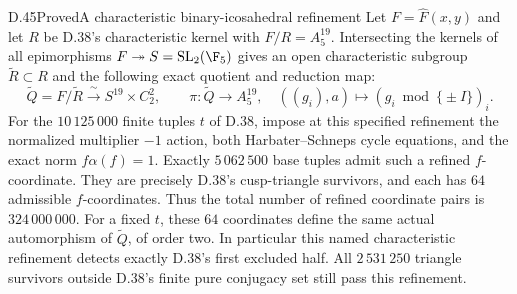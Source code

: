 \begin{claim}{D.45}{Proved}{A characteristic binary-icosahedral refinement}
Let $F=\widehat F(x,y)$ and let $R$ be D.38's characteristic
kernel with $F/R=A_5^{19}$.  Intersecting the kernels of all
epimorphisms $F\twoheadrightarrow S=\mathrm{SL}_2(\F_5)$ gives
an open characteristic subgroup $\widetilde R\subset R$ and
the following exact quotient and reduction map:
\[
 \widetilde Q=F/\widetilde R
       \xrightarrow{\ \sim\ }S^{19}\times C_2^2,
 \qquad
 \pi:\widetilde Q\longrightarrow A_5^{19},\quad
       ((g_i),a)\longmapsto(g_i\bmod\{\pm I\})_i.
                                                        \tag{D.45a}
\]
For the $10\,125\,000$ finite tuples $t$ of D.38, impose at
this specified refinement the normalized multiplier $-1$
action, both Harbater--Schneps cycle equations, and the
exact norm $f\alpha(f)=1$.
Exactly $5\,062\,500$ base tuples admit such a refined
$f$-coordinate.  They are precisely D.38's cusp-triangle
survivors, and each has $64$ admissible $f$-coordinates.
Thus the total number of refined coordinate pairs is
$324\,000\,000$.
For a fixed $t$, these $64$ coordinates define the same
actual automorphism of $\widetilde Q$, of order two.
In particular this named characteristic refinement
detects exactly D.38's first excluded half.  All
$2\,531\,250$ triangle survivors outside D.38's finite
pure conjugacy set still pass this refinement.
\end{claim}
